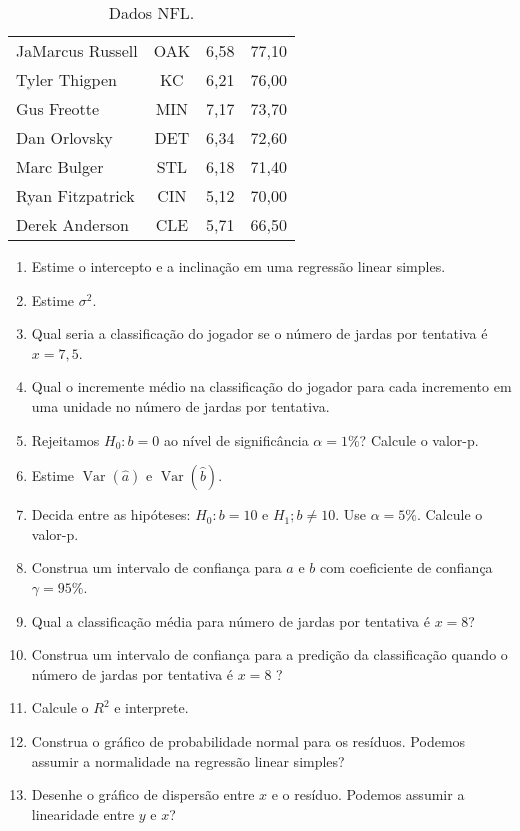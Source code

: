 \documentclass[12pt, a4paper]{article}
\DeclareMathOperator {\vari}{Var}
\begin{document}
\begin{enumerate}
\begin{table}[htbp]
{\begin{tabular}{l|c|c|c}
			JaMarcus Russell & OAK & 6,58 & 77,10 \\ 
			Tyler Thigpen & KC & 6,21 & 76,00 \\ 
			Gus Freotte & MIN & 7,17 & 73,70 \\ 
			Dan Orlovsky & DET & 6,34 & 72,60 \\ 
			Marc Bulger & STL & 6,18 & 71,40 \\ 
			Ryan Fitzpatrick & CIN & 5,12 & 70,00 \\ 
			Derek Anderson & CLE & 5,71 & 66,50 \\ 
			\bottomrule[0.05cm]
		\end{tabular}
		}
		\caption{Dados NFL.} 
		\label{tab:NFL}
	\end{table}
	\begin{enumerate}
		\item Estime o intercepto e a inclinação em uma regressão linear simples.
		\item Estime $\sigma^2$.
		\item Qual seria a classificação do jogador se o número de jardas por tentativa é $x=7,5$.
		\item Qual o incremente médio na classificação do jogador para cada incremento em uma unidade no número de jardas por tentativa.
		\item Rejeitamos $H_0: b = 0$ ao nível de significância $\alpha=1\%$? Calcule o valor-p.
		\item Estime $\vari\left(\hat{a}\right)$ e $\vari\left(\hat{b}\right)$.
		\item Decida entre as hipóteses: $H_0: b = 10$ e $H_1; b \neq 10$. Use $\alpha=5\%$. Calcule o valor-p. 
		\item Construa um intervalo de confiança para $a$ e $b$ com coeficiente de confiança $\gamma=95\%$.
		\item Qual a classificação média para número de jardas por tentativa é $x=8$?
		\item Construa um intervalo de confiança para a predição da classificação quando o número de jardas por tentativa é  $x=8$ ?
		\item Calcule o $R^2$ e interprete.
		\item Construa o gráfico de probabilidade normal para os resíduos. Podemos assumir a normalidade na regressão linear simples?
		\item Desenhe o gráfico de dispersão entre $x$ e o resíduo. Podemos assumir a linearidade entre $y$ e $x$?
	\end{enumerate}


\end{enumerate}
\end{document}
